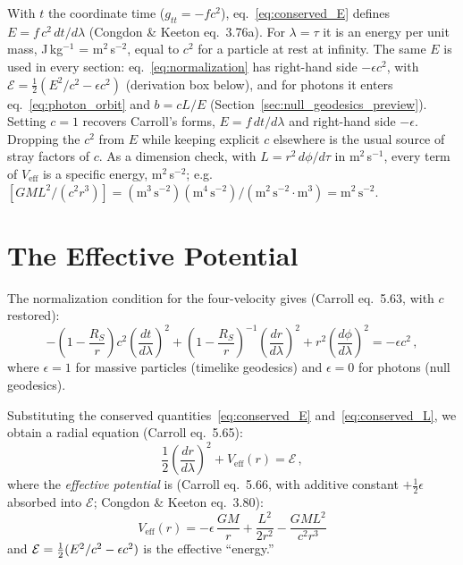\begin{annotation}
With $t$ the coordinate time ($g_{tt} = -fc^2$), eq.~\eqref{eq:conserved_E}
defines $E = f\,c^2\,dt/d\lambda$ (Congdon \& Keeton eq.~3.76a).  For
$\lambda = \tau$ it is an energy per unit mass, J\,kg$^{-1}$ =
m$^2$\,s$^{-2}$, equal to $c^2$ for a particle at rest at infinity.  The
same $E$ is used in every section:
eq.~\eqref{eq:normalization} has right-hand side $-\epsilon c^2$, with
$\mathcal{E} = \tfrac12(E^2/c^2 - \epsilon c^2)$
(derivation box below), and for photons it enters eq.~\eqref{eq:photon_orbit} and $b = cL/E$
(Section~\ref{sec:null_geodesics_preview}).
Setting $c = 1$ recovers Carroll's forms, $E = f\,dt/d\lambda$ and
right-hand side $-\epsilon$.  Dropping the $c^2$ from $E$ while keeping
explicit $c$ elsewhere is the usual source of stray factors of $c$.  As a dimension
check, with $L = r^2\,d\phi/d\tau$ in m$^2$\,s$^{-1}$, every term of
$V_{\mathrm{eff}}$ is a specific energy, m$^2$\,s$^{-2}$; e.g.\
$[GML^2/(c^2r^3)] = (\mathrm{m^3\,s^{-2}})(\mathrm{m^4\,s^{-2}})/
(\mathrm{m^2\,s^{-2}}\cdot\mathrm{m^3}) = \mathrm{m^2\,s^{-2}}$.
\end{annotation}



\section{The Effective Potential}
\label{sec:effective_potential}

The normalization condition for the four-velocity gives
(Carroll eq.~5.63, with $c$ restored):
\begin{equation}
    -\left(1 - \frac{R_S}{r}\right)c^2\left(\frac{dt}{d\lambda}\right)^2
    + \left(1 - \frac{R_S}{r}\right)^{-1}\left(\frac{dr}{d\lambda}\right)^2
    + r^2\left(\frac{d\phi}{d\lambda}\right)^2 = -\epsilon c^2 \,,
    \label{eq:normalization}
\end{equation}
where $\epsilon = 1$ for massive particles (timelike geodesics) and
$\epsilon = 0$ for photons (null geodesics).

Substituting the conserved quantities~\eqref{eq:conserved_E}
and~\eqref{eq:conserved_L}, we obtain a radial equation
(Carroll eq.~5.65):
\begin{equation}
    \frac{1}{2}\left(\frac{dr}{d\lambda}\right)^2 + V_{\mathrm{eff}}(r)
    = \mathcal{E} \,,
    \label{eq:radial_equation}
\end{equation}
where the \emph{effective potential} is (Carroll eq.~5.66, with
additive constant $+\tfrac{1}{2}\epsilon$ absorbed into $\mathcal{E}$;
Congdon \& Keeton eq.~3.80):
\begin{equation}
    \boxed{
    V_{\mathrm{eff}}(r) = -\epsilon\,\frac{GM}{r}
    + \frac{L^2}{2r^2}
    - \frac{GML^2}{c^2 r^3}
    }
    \label{eq:effective_potential}
\end{equation}
and $\mathcal{E} = \tfrac{1}{2}(E^2/c^2 - \epsilon c^2)$ is the effective ``energy.''

